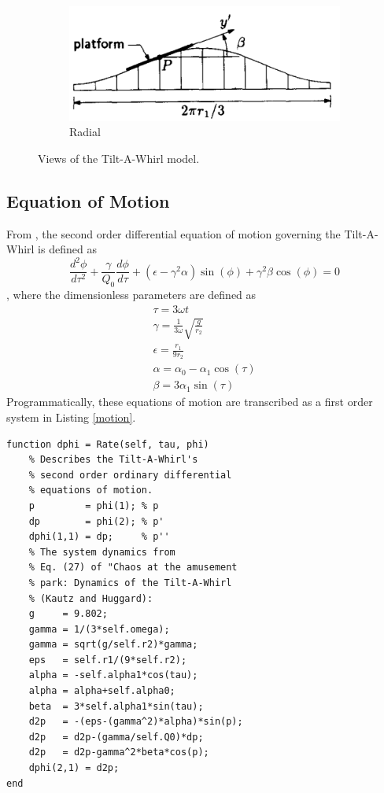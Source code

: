 \documentclass{article}
\begin{document}
\begin{figure}
\begin{subfigure}{0.49\textwidth}
\includegraphics[width=0.9\linewidth]{Pics/tawradial.png}
\caption{Radial}
\end{subfigure}
 
\caption{Views of the Tilt-A-Whirl model.}
\cite{Kautz1994}
\label{fig:tawplan}
\end{figure}

\subsection{Equation of Motion}
From \cite{Kautz1994}, the second order differential equation of motion governing the Tilt-A-Whirl is defined as
\begin{equation}
\label{eq:motion}
\frac{d^2\phi}{d\tau^2} + \frac{\gamma}{Q_0} \frac{d\phi}{d\tau} + \left(\epsilon - \gamma^2\alpha \right) \sin\left(\phi\right) + \gamma^2\beta\cos\left(\phi\right) = 0
\end{equation}
, where the dimensionless parameters are defined as 
\begin{gather}
\tau = 3\omega t \\
\gamma = \frac{1}{3\omega} \sqrt{\frac{g}{r_2}}  \\
\epsilon = \frac{r_1}{9r_2} \\
\alpha = \alpha_0 - \alpha_1 \cos \left( \tau \right) \\
\beta = 3 \alpha_1 \sin \left(\tau\right)
\end{gather}
Programmatically, these equations of motion are transcribed as a first order system in Listing \ref{motion}.
\begin{lstlisting}[caption=Equations of Motion, label=motion]
function dphi = Rate(self, tau, phi)
    % Describes the Tilt-A-Whirl's
    % second order ordinary differential
    % equations of motion.
    p         = phi(1); % p
    dp        = phi(2); % p'
    dphi(1,1) = dp;     % p''
    % The system dynamics from
    % Eq. (27) of "Chaos at the amusement
    % park: Dynamics of the Tilt-A-Whirl
    % (Kautz and Huggard):
    g     = 9.802;
    gamma = 1/(3*self.omega);
    gamma = sqrt(g/self.r2)*gamma;
    eps   = self.r1/(9*self.r2);
    alpha = -self.alpha1*cos(tau);
    alpha = alpha+self.alpha0;
    beta  = 3*self.alpha1*sin(tau);
    d2p   = -(eps-(gamma^2)*alpha)*sin(p);
    d2p   = d2p-(gamma/self.Q0)*dp;
    d2p   = d2p-gamma^2*beta*cos(p);
    dphi(2,1) = d2p;
end
\end{lstlisting}
\end{document}
